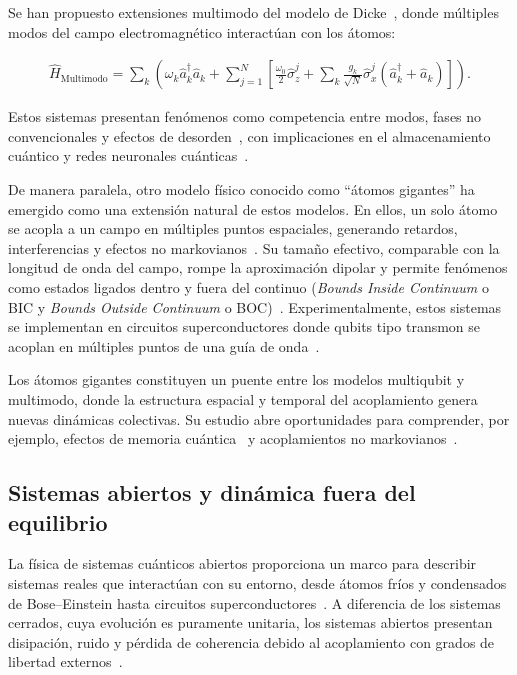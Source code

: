 \documentclass[onecolumn,notitlepage,letterpaper,aps,pra,12pt]{article}
\numberwithin{equation}{section}
\begin{document}
Se han propuesto extensiones multimodo del modelo de Dicke~\cite{tolkunov2007}, donde múltiples modos del campo electromagnético interactúan con los átomos:

\begin{gather}
        \hat{H}_{\text{Multimodo}} = \sum_{k}\left(\omega_{k}\hat{a}^{\dagger}_{k}\hat{a}_{k} + \sum_{j=1}^{N}\left[ \frac{\omega_{0}}{2}\hat{\sigma}_{z}^{j} + \sum_{k}\frac{g_{k}}{\sqrt{N}}\hat{\sigma}_{x}^{j}\left(\hat{a}^{\dagger}_{k} + \hat{a}_{k}\right) \right]\right).
\end{gather}

Estos sistemas presentan fenómenos como competencia entre modos, fases no convencionales y efectos de desorden~\cite{rotondo2015}, con implicaciones en el almacenamiento cuántico y redes neuronales cuánticas~\cite{marsch2021}.

De manera paralela, otro modelo físico conocido como “átomos gigantes” ha emergido como una extensión natural de estos modelos. En ellos, un solo átomo se acopla a un campo en múltiples puntos espaciales, generando retardos, interferencias y efectos no markovianos~\cite{gonzalez2021-2}. Su tamaño efectivo, comparable con la longitud de onda del campo, rompe la aproximación dipolar y permite fenómenos como estados ligados dentro y fuera del continuo (\textit{Bounds Inside Continuum} o BIC y  \textit{Bounds Outside Continuum} o BOC)~\cite{gonzalez2025}. Experimentalmente, estos sistemas se implementan en circuitos superconductores donde qubits tipo transmon se acoplan en múltiples puntos de una guía de onda~\cite{Kannan2020}.

Los átomos gigantes constituyen un puente entre los modelos multiqubit y multimodo, donde la estructura espacial y temporal del acoplamiento genera nuevas dinámicas colectivas. Su estudio abre oportunidades para comprender, por ejemplo, efectos de memoria cuántica~\cite{fiorelli2020} y acoplamientos no markovianos~\cite{gonzalez2025}. 


\subsection{Sistemas abiertos y dinámica fuera del equilibrio}

La física de sistemas cuánticos abiertos proporciona un marco para describir sistemas reales que interactúan con su entorno, desde átomos fríos y condensados de Bose–Einstein hasta circuitos superconductores~\cite{rotter2015}. A diferencia de los sistemas cerrados, cuya evolución es puramente unitaria, los sistemas abiertos presentan disipación, ruido y pérdida de coherencia debido al acoplamiento con grados de libertad externos~\cite{Sieberer2016,breuer2003}.
\end{document}
